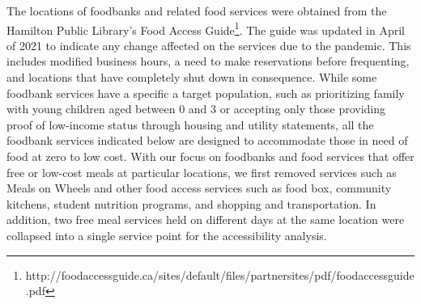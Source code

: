 \documentclass[]{elsarticle} %
\begin{document}
The locations of foodbanks and related food services were obtained from
the Hamilton Public Library's Food Access Guide\footnote{http://foodaccessguide.ca/sites/default/files/partnersites/pdf/foodaccessguide.pdf}.
The guide was updated in April of 2021 to indicate any change affected
on the services due to the pandemic. This includes modified business
hours, a need to make reservations before frequenting, and locations
that have completely shut down in consequence. While some foodbank
services have a specific a target population, such as prioritizing
family with young children aged between 0 and 3 or accepting only those
providing proof of low-income status through housing and utility
statements, all the foodbank services indicated below are designed to
accommodate those in need of food at zero to low cost. With our focus on
foodbanks and food services that offer free or low-cost meals at
particular locations, we first removed services such as Meals on Wheels
and other food access services such as food box, community kitchens,
student nutrition programs, and shopping and transportation. In
addition, two free meal services held on different days at the same
location were collapsed into a single service point for the
accessibility analysis.
\end{document}

